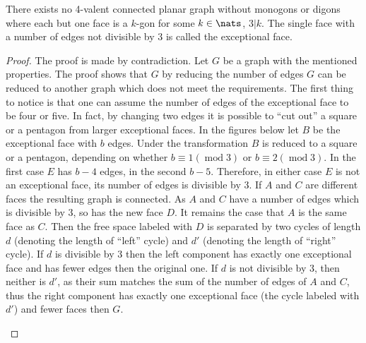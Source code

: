 \begin{lemma}
  There exists no 4-valent connected planar graph without monogons or digons where each but one face is a $k$-gon for some $k \in \nats$, $3 | k$. The single face with a number of edges not divisible by $3$ is called the exceptional face.
  \begin{proof} The proof is made by contradiction. Let $G$ be a graph with the mentioned properties. The proof shows that $G$ by reducing the number of edges $G$ can be reduced to another graph which does not meet the requirements. The first thing to notice is that one can assume the number of edges of the exceptional face to be four or five. In fact, by changing two edges it is possible to ``cut out'' a square or a pentagon from larger exceptional faces.
    In the figures below let $B$ be the exceptional face with $b$ edges. Under the transformation $B$ is reduced to a square or a pentagon, depending on whether $b \equiv 1 (\operatorname{mod} 3)$ or $b \equiv 2 (\operatorname{mod} 3)$. In the first case $E$ has $b - 4$ edges, in the second $b-5$. Therefore, in either case $E$ is not an exceptional face, its number of edges is divisible by $3$. If $A$ and $C$ are different faces the resulting graph is connected. As $A$ and $C$ have a number of edges which is divisible by $3$, so has the new face $D$. It remains the case that $A$ is the same face as $C$. Then the free space labeled with $D$ is separated by two cycles of length $d$ (denoting the length of ``left'' cycle) and $d'$ (denoting the length of ``right'' cycle). If $d$ is divisible by $3$ then the left component has exactly one exceptional face and has fewer edges then the original one. If $d$ is not divisible by $3$, then neither is $d'$, as their sum matches the sum of the number of edges of $A$ and $C$, thus the right component has exactly one exceptional face (the cycle labeled with $d'$) and fewer faces then $G$.
    \begin{figure}[htpp]
      \centering
\end{figure}
\end{proof}
\end{lemma}
